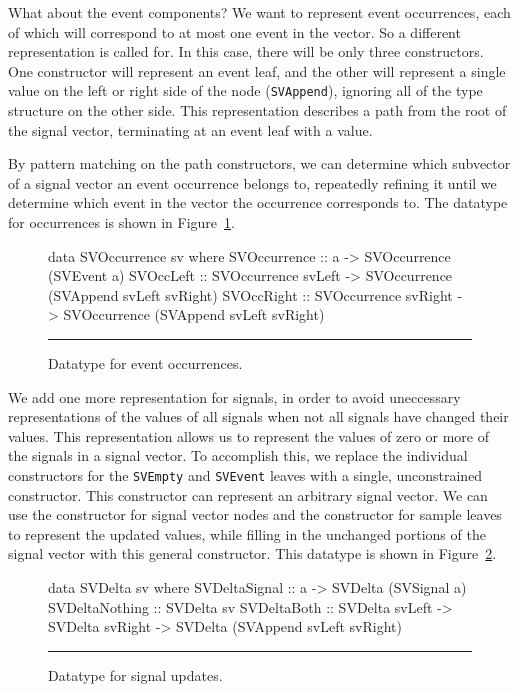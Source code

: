 \documentclass[draft]{llncs}
\begin{document}
What about the event components? We want to represent event occurrences,
each of which will correspond to at most one event in the vector. So a different
representation is called for. In this case, there will be only three
constructors. One constructor will represent an event leaf, and the other will
represent a single value on the left or right side of the node ({\tt SVAppend}),
ignoring all of the type structure on the other side. This representation
describes a path from the root of the signal vector, terminating at an event
leaf with a value.

By pattern matching on the path constructors, we can determine which subvector
of a signal vector an event occurrence belongs to, repeatedly refining it until
we determine which event in the vector the occurrence corresponds to. The
datatype for occurrences is shown in Figure~\ref{figure:event_occurrence_datatype}.

\begin{figure}
\begin{code}
data SVOccurrence sv where
  SVOccurrence ::    a
                  -> SVOccurrence (SVEvent a)
  SVOccLeft    ::    SVOccurrence svLeft
                  -> SVOccurrence (SVAppend svLeft svRight)
  SVOccRight   ::    SVOccurrence svRight 
                  -> SVOccurrence (SVAppend svLeft svRight)
\end{code}
\hrule
\caption{Datatype for event occurrences.}
\label{figure:event_occurrence_datatype}
\end{figure}

We add one more representation for signals, in order to avoid uneccessary
representations of the values of all signals when not all signals have changed
their values. This representation allows us to represent the values of zero or
more of the signals in a signal vector. To accomplish this, we replace the
individual constructors for the {\tt SVEmpty} and {\tt SVEvent} leaves with %
a single, unconstrained constructor. This constructor can represent an arbitrary
signal vector. We can use the constructor for signal vector nodes and the 
constructor for sample leaves to represent the updated values, while filling
in the unchanged portions of the signal vector with this general constructor.
This datatype is shown in Figure~\ref{figure:signal_update_datatype}.

\begin{figure}
\begin{code}
data SVDelta sv where
  SVDeltaSignal  ::    a
                    -> SVDelta (SVSignal a)
  SVDeltaNothing ::    SVDelta sv
  SVDeltaBoth    ::    SVDelta svLeft
                    -> SVDelta svRight
                    -> SVDelta (SVAppend svLeft svRight)
\end{code}
\hrule
\caption{Datatype for signal updates.}
\label{figure:signal_update_datatype}
\end{figure}
\end{document}

